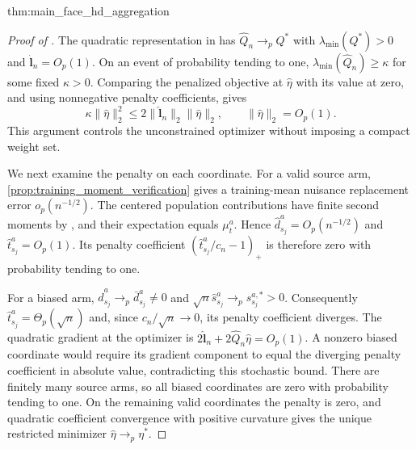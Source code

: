 \documentclass[12pt]{article}
\begin{document}
\begin{restatedmain}{thm:main_face_hd_aggregation}
\FACEHDJointAggregation
\end{restatedmain}
\label{proof:main_aggregation}
\begin{proof}[Proof of ]
The quadratic representation in  has $\widehat Q_n\to_p Q^*$ with $\lambda_{\min}(Q^*)>0$ and $\widehat{\boldsymbol l}_n=O_p(1)$. On an event of probability tending to one, $\lambda_{\min}(\widehat Q_n)\ge\kappa$ for some fixed $\kappa>0$. Comparing the penalized objective at $\widehat\eta$ with its value at zero, and using nonnegative penalty coefficients, gives
\[
\kappa\|\widehat\eta\|_2^2
\le2\|\widehat{\boldsymbol l}_n\|_2\|\widehat\eta\|_2,
\qquad\|\widehat\eta\|_2=O_p(1).
\]
This argument controls the unconstrained optimizer without imposing a compact weight set.

We next examine the penalty on each coordinate. For a valid source arm, \cref{prop:training_moment_verification} gives a training-mean nuisance replacement error $o_p(n^{-1/2})$. The centered population contributions have finite second moments by , and their expectation equals $\mu_t^a$. Hence $\widehat d_{s_j}^a=O_p(n^{-1/2})$ and $\widehat t_{s_j}^a=O_p(1)$. Its penalty coefficient $(\widehat t_{s_j}^a/c_n-1)_+$ is therefore zero with probability tending to one.

For a biased arm, $\widehat d_{s_j}^a\to_p\bar d_{s_j}^a\ne0$ and $\sqrt n\widehat s_{s_j}^a\to_p s_{s_j}^{a,*}>0$. Consequently $\widehat t_{s_j}^a=\Theta_p(\sqrt n)$ and, since $c_n/\sqrt n\to0$, its penalty coefficient diverges. The quadratic gradient at the optimizer is $2\widehat{\boldsymbol l}_n+2\widehat Q_n\widehat\eta=O_p(1)$.
A nonzero biased coordinate would require its gradient component to equal the diverging penalty coefficient in absolute value, contradicting this stochastic bound. There are finitely many source arms, so all biased coordinates are zero with probability tending to one. On the remaining valid coordinates the penalty is zero, and quadratic coefficient convergence with positive curvature gives the unique restricted minimizer $\widehat\eta\to_p\eta^*$.


\end{proof}
\end{document}
